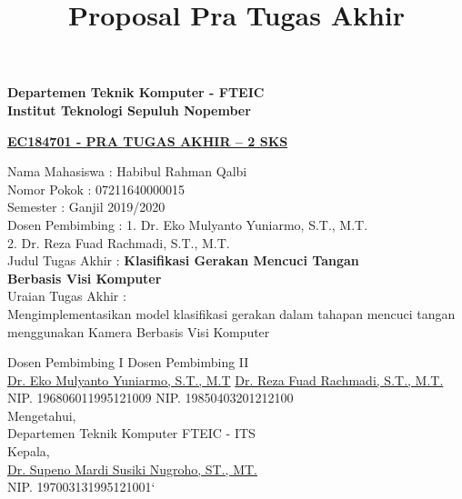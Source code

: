\documentclass[a4paper]{article}
\title{Proposal Pra Tugas Akhir}
\begin{document}
	\begin{flushleft}
		\textbf{Departemen Teknik Komputer - FTEIC}\\
		\textbf{Institut Teknologi Sepuluh Nopember}\\
	\end{flushleft}
	\begin{center}
		\underline{\textbf{EC184701 - PRA TUGAS AKHIR – 2 SKS}}
	\end{center}
\begin{flushleft}
		Nama Mahasiswa \tab : Habibul Rahman Qalbi\\
		Nomor Pokok \tab : 07211640000015 \\
		Semester \tab : Ganjil 2019/2020\\
		Dosen Pembimbing \tab : 1. Dr. Eko Mulyanto Yuniarmo, S.T., M.T.\\
		\tab \hspace{1mm} 2. Dr. Reza Fuad Rachmadi, S.T., M.T.\\
		Judul Tugas Akhir \tab : \textbf{Klasifikasi Gerakan Mencuci Tangan\\
		\tab \hspace{1mm} Berbasis Visi Komputer}\\
		Uraian Tugas Akhir \tab :\\
		Mengimplementasikan model klasifikasi gerakan dalam tahapan mencuci tangan menggunakan Kamera Berbasis Visi Komputer 
\end{flushleft}
\vspace{5mm}
\begin{flushleft}
	Dosen Pembimbing I \tab Dosen Pembimbing II\\
	\vspace{2cm}
	\underline{Dr. Eko Mulyanto Yuniarmo, S.T., M.T} \tab \underline{Dr. Reza Fuad Rachmadi, S.T., M.T.} \\
	NIP. 196806011995121009 \tab NIP. 19850403201212100 \\
	
	\vspace{cm}
	\hspace{4cm} Mengetahui,\\
	\hspace{4cm} Departemen Teknik Komputer FTEIC - ITS \\
	\hspace{4cm} Kepala, \\
	\vspace{2cm}
	\hspace{4cm} \underline{Dr. Supeno Mardi Susiki Nugroho, ST., MT.} \\
	\hspace{4cm} NIP. 197003131995121001`	
\end{flushleft}
\end{document}
